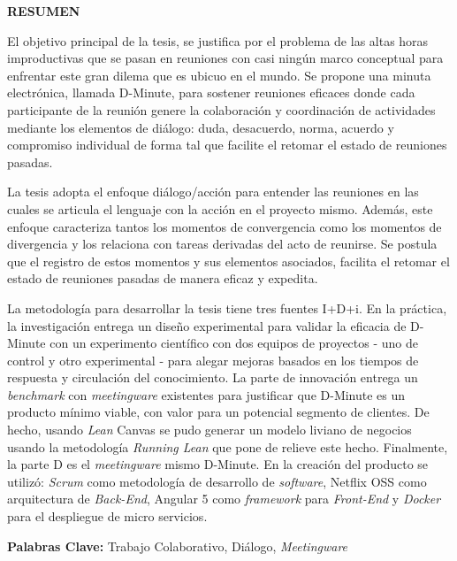 \begin{center}

\textbf{\large{RESUMEN}}

\end{center}

El objetivo principal de la tesis, se justifica por el problema de las altas horas improductivas que se pasan en reuniones con casi ningún marco conceptual para enfrentar este gran dilema que es ubicuo en el mundo. Se propone una minuta electrónica, llamada D-Minute, para sostener reuniones eficaces donde cada participante de la reunión genere la colaboración y coordinación de actividades mediante los elementos de diálogo: duda, desacuerdo, norma, acuerdo y compromiso individual de forma tal que facilite el retomar el estado de reuniones pasadas. 

La tesis adopta el enfoque diálogo/acción para entender las reuniones en las cuales se articula el lenguaje con la acción en el proyecto mismo. Además, este enfoque caracteriza tantos los momentos de convergencia como los momentos de divergencia y los relaciona con tareas derivadas del acto de reunirse.  Se postula que el registro de estos momentos y sus elementos asociados, facilita el retomar el estado de reuniones pasadas de manera eficaz y expedita.

La metodología para desarrollar la tesis tiene tres fuentes I+D+i. En la práctica, la investigación entrega un diseño experimental para validar la eficacia de D-Minute con un experimento científico con dos equipos de proyectos - uno de control y otro experimental - para alegar mejoras basados en los tiempos de respuesta y circulación del conocimiento. La parte de innovación entrega un \textit{benchmark} con \textit{meetingware} existentes para justificar que D-Minute es un producto mínimo viable, con valor para un potencial segmento de clientes. De hecho, usando \textit{Lean} Canvas se pudo generar un modelo liviano de negocios usando la metodología \textit{Running Lean} que pone de relieve este hecho. Finalmente, la parte D es el \textit{meetingware} mismo D-Minute. En la creación del producto se utilizó: \textit{Scrum} como metodología de desarrollo de \textit{software}, Netflix OSS como arquitectura de \textit{Back-End}, Angular 5  como \textit{framework} para \textit{Front-End} y \textit{Docker} para el despliegue de micro servicios.\\

\begin{flushleft}
\textbf{Palabras Clave:} Trabajo Colaborativo, Diálogo, \textit{Meetingware}
\end{flushleft}